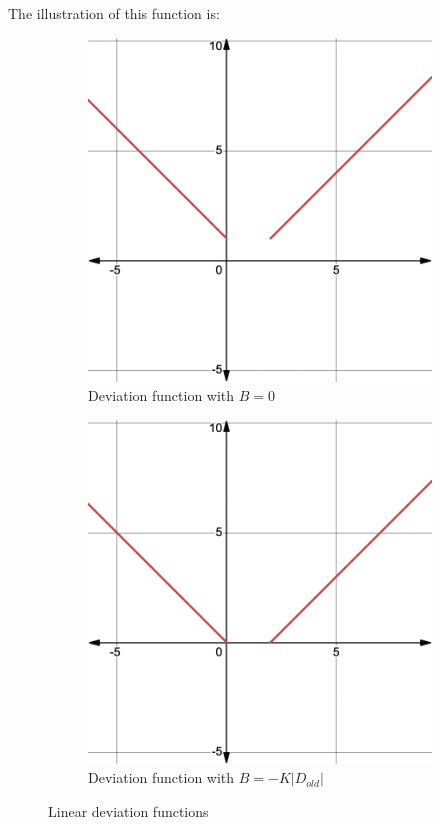 The illustration of this function is:

\begin{figure}[h!]
	\centering
	\begin{subfigure}{0.4\textwidth}
		\centering
		\includegraphics[width=\linewidth]{deviation_function_no_offset.png} 
		\caption{Deviation function with $B = 0$ }
		\label{fig:img1}
	\end{subfigure}
	\hfill 
	\begin{subfigure}{0.4\textwidth}
		\centering
		\includegraphics[width=\linewidth]{deviation_function_with_offset.png} 
		\caption{Deviation function with $B = - K \lvert D_{old} \rvert$ }
		\label{fig:img2}
	\end{subfigure}
    \caption{Linear deviation functions}
	\label{fig:img3}
\end{figure}
\FloatBarrier

